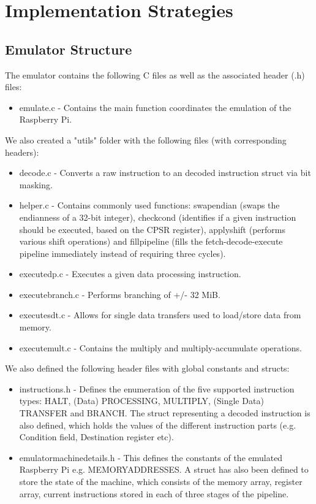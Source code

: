 \documentclass[11pt,twoside]{article}
\begin{document}
\section{Implementation Strategies}
\subsection{Emulator Structure}
The emulator contains the following C files as well as the associated header (.h) files:
\begin{itemize}
\item emulate.c - Contains the main function coordinates the emulation of the Raspberry Pi.
\end{itemize}

We also created a "utils" folder with the following files (with corresponding headers):
\begin{itemize}
\item decode.c - Converts a raw instruction to an decoded instruction struct via bit masking.
\item helper.c - Contains commonly used functions: swap\textunderscore endian (swaps the endianness of a 32-bit integer), check\textunderscore cond (identifies if a given instruction should be executed, based on the CPSR register), apply\textunderscore shift (performs various shift operations) and fill\textunderscore pipeline (fills the fetch-decode-execute pipeline immediately instead of requiring three cycles).
\item execute\textunderscore dp.c - Executes a given data processing instruction.
\item execute\textunderscore branch.c - Performs branching of +/- 32 MiB.
\item execute\textunderscore sdt.c - Allows for single data transfers used to load/store data from memory.
\item execute\textunderscore mult.c - Contains the multiply and multiply-accumulate operations.
\end{itemize}

We also defined the following header files with global constants and structs:

\begin{itemize}
\item instructions.h - Defines the enumeration of the five supported instruction types: HALT, (Data) PROCESSING, MULTIPLY, (Single Data) TRANSFER and BRANCH. The struct representing a decoded instruction is also defined, which holds the values of the different instruction parts (e.g. Condition field, Destination register etc).    

\item emulator\textunderscore machine\textunderscore details.h - This defines the constants of the emulated Raspberry Pi e.g. MEMORY\textunderscore ADDRESSES. A struct has also been defined to store the state of the machine, which consists of the memory array, register array, current instructions stored in each of three stages of the pipeline.
\end{itemize}
\end{document}
